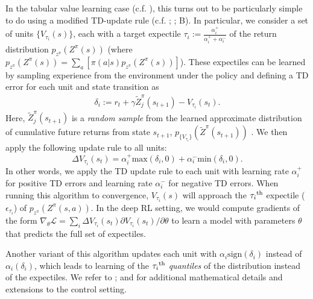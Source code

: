 In the tabular value learning case (c.f. ), this turns out to be particularly simple to do using a modified TD-update rule (c.f. ; \citealp{lowet2020distributional}; B).
In particular, we consider a set of units $\{ V_{\tau_i}(s) \}$, each with a target expectile $\tau_i := \frac{\alpha_i^+}{\alpha_i^+ + \alpha_i^-}$ of the return distribution $p_{z^\pi}(Z^\pi(s))$ (where $p_{z^\pi}(Z^\pi(s)) = \sum_a \left [ \pi(a|s) p_{z^\pi}(Z^\pi(s)) \right ] $).
These expectiles can be learned by sampling experience from the environment under the policy and defining a TD error for each unit and state transition as
\begin{align}
    \delta_i := r_t + \gamma \tilde{Z}^\pi_j(s_{t+1}) - V_{\tau_i}(s_t).
\end{align}
Here, $\tilde{Z}^\pi_j(s_{t+1})$ is a \emph{random sample} from the learned approximate distribution of cumulative future returns from state $s_{t+1}$, $p_{\{ V_{\tau_i} \} }(\tilde{Z}^\pi(s_{t+1}))$ \citep{lowet2020distributional,dabney2020distributional}.
We then apply the following update rule to all units:
\begin{equation}
    \label{eq:DRL_V_expec}
    \Delta V_{\tau_i}(s_t) = \alpha_i^+ \text{max}(\delta_i, 0 ) + \alpha_i^- \text{min}(\delta_i, 0).
\end{equation}
In other words, we apply the TD update rule to each unit with learning rate $\alpha_i^+$ for positive TD errors and learning rate $\alpha_i^-$ for negative TD errors.
When running this algorithm to convergence, $V_{\tau_i}(s)$ will approach the $\tau_i\textsuperscript{th}$ expectile ($\epsilon_{\tau_i}$) of $p_{z^\pi}(Z^\pi(s, a))$.
In the deep RL setting, we would compute gradients of the form $\nabla_\theta \mathcal{L} = \sum_i \Delta V_{\tau_i}(s_t) \partial V_{\tau_i}(s_t) / \partial \theta$ to learn a model with parameters $\theta$ that predicts the full set of expectiles.

Another variant of this algorithm updates each unit with $\alpha_i \text{sign}(\delta_i)$ instead of $\alpha_i (\delta_i)$, which leads to learning of the $\tau_i\textsuperscript{th}$ \emph{quantiles} of the distribution instead of the expectiles.
We refer to \citet{bellemare2017distributional,dabney2018distributional,rowland2019statistics,bellemare2023distributional}; and \citet{dabney2020distributional} for additional mathematical details and extensions to the control setting.



